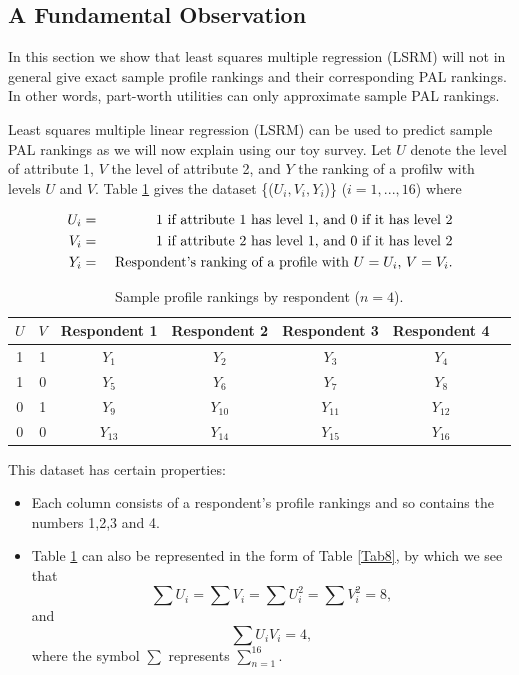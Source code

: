 \documentclass[a4paper, 12pt]{article}
\begin{document}
\subsection{A Fundamental Observation}
In this section we show that  least squares multiple  regression (LSRM) will not in general give exact sample profile rankings and their corresponding PAL rankings. In other words, part-worth utilities can only approximate sample PAL rankings.


Least squares multiple linear regression (LSRM) can be used to predict sample PAL rankings as we will now explain using our toy survey.  Let $U$ denote the level of attribute 1, $V$ the level of attribute 2, and $Y$ the ranking of a profilw with levels $U$ and $V$. Table \ref{Tab7} gives the dataset \{($U_i,V_i,Y_i$)\} ($i = 1,...,16$) where

\begin{eqnarray*}
	U_i&=& 1 \textup{ if attribute 1 has level 1, and 0 if it has level 2}\\
	V_i&=& 1 \textup{ if attribute 2 has level 1, and 0 if it has level 2}\\
	Y_i&=& \textup{ Respondent's ranking of a profile with $U=U_i$, $V=V_i$.}
\end{eqnarray*}

\begin{table}[!htpb]
	\centering
	\small
	\begin{tabular}{cc|ccccc}	\hline
		$U$ & $V$ & Respondent 1&  Respondent 2& Respondent 3& Respondent 4\\  \hline
		1 &1&$Y_1$&$Y_2$&$Y_3$&$Y_4$\\
		1 &0&$Y_5$&$Y_6$&$Y_7$&$Y_8$ \\
		0 &1&$Y_9$&$Y_{10}$&$Y_{11}$&$Y_{12}$ \\
		0 &0&$Y_{13}$&$Y_{14}$&$Y_{15}$&$Y_{16}$ \\\hline
	\end{tabular}
	\caption{{\small Sample profile rankings by respondent ($n=4$).}}
	\label{Tab7}
\end{table}


This dataset has certain properties:
\begin{itemize}
	\item
	Each column consists of a respondent's profile rankings and so contains the numbers 1,2,3 and 4.
	\item
	Table \ref{Tab7} can also be represented in the form of Table \ref{Tab8}, by which we see that $$\sum U_i = \sum V_i = \sum U_i^2 = \sum V_i^2= 8, $$ and $$ \sum U_iV_i = 4,$$ where the symbol $\sum $ represents $\displaystyle \sum_{n=1}^{16}$.
\end{itemize}
\end{document}
